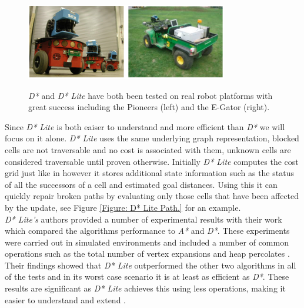 \begin{figure}[htbp]

\center \includegraphics[width=250pt]{illustrations/example_robots}\\
\caption{\textit{D*} and \textit{D* Lite} have both been tested on real robot platforms with great success including the Pioneers (left) and the E-Gator (right). \cite{HEURISTIC}}
\label{Figure: D* Robots.}

\end{figure}

\noindent
Since \textit{D* Lite} is both eaiser to understand and more efficient \cite{HEURISTIC}\cite{D*LITE} than \textit{D*} we will focus on it alone. \textit{D* Lite} uses the same underlying graph representation, blocked cells are not traversable and no cost is associated with them, unknown cells are considered traversable until proven otherwise. Initially \textit{D* Lite} computes the cost grid just like in \cite{GRIDNAV95} however it stores additional state information such as the status of all the successors of a cell and estimated goal distances. Using this it can quickly repair broken paths by evaluating only those cells that have been affected by the update, see Figure \ref{Figure: D* Lite Path.} for an example.\\

\noindent
\textit{D* Lite's} authors provided a number of experimental results with their work which compared the algorithms performance to \textit{A*} and \textit{D*}. These experiments were carried out in simulated environments and included a number of common operations such as the total number of vertex expansions and heap percolates \cite{D*LITE}. Their findings showed that \textit{D* Lite} outperformed the other two algorithms in all of the tests and in its worst case scenario it is at least as efficient as \textit{D*}. These results are significant as \textit{D* Lite} achieves this using less operations, making it easier to understand and extend \cite{HEURISTIC}.

